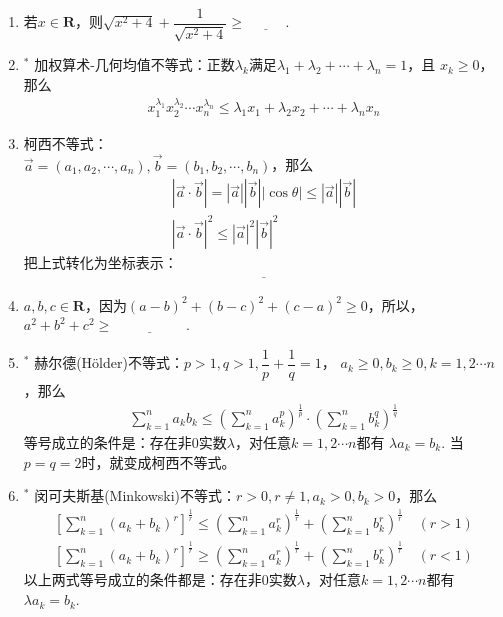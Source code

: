 \documentclass{article}
\newif\ifte
\renewcommand{\vec}{\overrightarrow}
\renewcommand\leq\leqslant
\renewcommand\geq\geqslant
\begin{document}
\begin{multicols}{2}
\begin{enumerate}[leftmargin=20pt]
\item 若$ x\in \textbf{R} $，则$ \sqrt{x^2+4}+\dfrac{1}{\sqrt{x^2+4}}
\geq \underline{\ \ifte \dfrac{5}{2}\else \hspace{1cm} \fi\ } $.

\item $^*$ 加权算术-几何均值不等式：正数$ \lambda_k $满足$ \lambda_1+
\lambda_2+\cdots +\lambda_n=1 $，且 $ x_k\geq 0 $，那么
\begin{align*}
    x_1^{\lambda_1}x_2^{\lambda_2}\cdots x_n^{\lambda_n}\leq 
    \lambda_1x_1+\lambda_2x_2+\cdots +\lambda_nx_n
\end{align*}

\item 柯西不等式：\\ $ \vec{a}=(a_1,a_2,\cdots,a_n),
\vec{b}=(b_1,b_2,\cdots,b_n) $，那么
\begin{gather*}
    |\vec{a}\cdot \vec{b}|
    =|\vec{a}||\vec{b}||\cos\theta|\leq 
    |\vec{a}||\vec{b}| \\
    |\vec{a}\cdot \vec{b}|^2 \leq 
    |\vec{a}|^2|\vec{b}|^2 
\end{gather*}
把上式转化为坐标表示：
\begin{gather*}
    \underline{\ \ifte \left( \sum_{k=1}^{n}a_kb_k\right)^2 
    \leq \left(\sum_{k=1}^{n}a_k^2\right) 
    \left(\sum_{k=1}^{n}b_k^2 \right) \else \hspace{5cm} \fi\ }
\end{gather*}

\item $ a,b,c\in \textbf{R} $，因为$ (a-b)^2+(b-c)^2+(c-a)^2\geq 0 $，所以，
$ a^2+b^2+c^2\geq \underline{\ \ifte ab+bc+ca\else \hspace{2cm} \fi\ } $.

\item $^*$ 赫尔德(Hölder)不等式：$ p>1,q>1,\dfrac{1}{p}+\dfrac{1}{q}=1 $，
$ a_k\geq 0,b_k\geq 0,k=1,2\cdots n $，那么
\begin{gather*}
    \sum_{k=1}^{n}a_kb_k\leq \left(\sum_{k=1}^{n}a_k^p\right)^{\frac{1}{p}}
    \cdot\left(\sum_{k=1}^{n}b_k^q\right)^{\frac{1}{q}}
\end{gather*}
等号成立的条件是：存在非0实数$ \lambda $，对任意$ k=1,2\cdots n $都有
$ \lambda a_k=b_k $. 当$ p=q=2 $时，就变成柯西不等式。

\item $^*$ 闵可夫斯基(Minkowski)不等式：$ r>0,r\neq 1,a_k>0,b_k>0 $，那么
\begin{align*}
    \left[\sum_{k=1}^{n}(a_k+b_k)^r\right]^{\frac{1}{r}}\leq
    \left(\sum_{k=1}^{n}a_k^r\right)^{\frac{1}{r}}+
    \left(\sum_{k=1}^{n}b_k^r\right)^{\frac{1}{r}} \quad(r>1) \\
    \left[\sum_{k=1}^{n}(a_k+b_k)^r\right]^{\frac{1}{r}}\geq
    \left(\sum_{k=1}^{n}a_k^r\right)^{\frac{1}{r}}+
    \left(\sum_{k=1}^{n}b_k^r\right)^{\frac{1}{r}} \quad(r<1)
\end{align*}
以上两式等号成立的条件都是：存在非0实数$ \lambda $，对任意$ k=1,2\cdots n $都有
$ \lambda a_k=b_k $. 


\end{enumerate}
\end{multicols}
\end{document}
